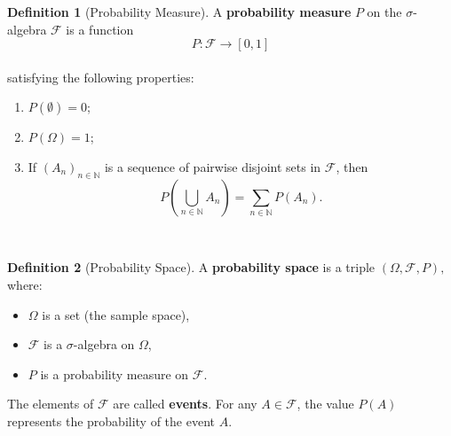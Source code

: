 \documentclass[
  11pt,
  a4paper,
]{book}
\providecommand{\tightlist}{%
  \setlength{\itemsep}{0pt}\setlength{\parskip}{0pt}}
\theoremstyle{definition}
\newtheorem{definition}{Definition}[chapter]
\theoremstyle{definition}
\theoremstyle{definition}
\theoremstyle{definition}
\theoremstyle{remark}
\begin{document}
\begin{definition}[Probability Measure]

A \textbf{probability measure} \(P\) on the \(\sigma\)-algebra \(\mathcal{F}\) is a function\\
\[
P: \mathcal{F} \rightarrow [0, 1]
\]\\
satisfying the following properties:

\begin{enumerate}
\def\labelenumi{\arabic{enumi}.}
\item
  \(P(\emptyset) = 0\);
\item
  \(P(\Omega) = 1\);
\item
  If \((A_n)_{n \in \mathbb{N}}\) is a sequence of pairwise disjoint sets in \(\mathcal{F}\), then\\
  \[
  P\left(\bigcup_{n \in \mathbb{N}} A_n\right) = \sum_{n \in \mathbb{N}} P(A_n).
  \]
\end{enumerate}

\end{definition}

\(\,\)

\begin{definition}[Probability Space]
A \textbf{probability space} is a triple \((\Omega, \mathcal{F}, P),\) where:

\begin{itemize}
\tightlist
\item
  \(\Omega\) is a set (the sample space),
\item
  \(\mathcal{F}\) is a \(\sigma\)-algebra on \(\Omega\),
\item
  \(P\) is a probability measure on \(\mathcal{F}\).
\end{itemize}

The elements of \(\mathcal{F}\) are called \textbf{events}. For any \(A \in \mathcal{F}\), the value \(P(A)\) represents the probability of the event \(A\).
\end{definition}

\(\,\)
\end{document}
